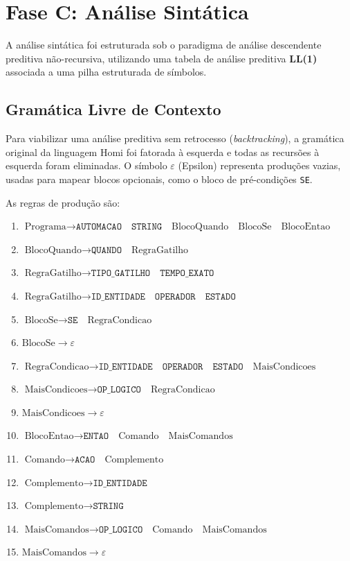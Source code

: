 \documentclass[12pt, a4paper]{article}
\begin{document}
\section{Fase C: Análise Sintática}
A análise sintática foi estruturada sob o paradigma de análise descendente preditiva não-recursiva, utilizando uma tabela de análise preditiva \textbf{LL(1)} associada a uma pilha estruturada de símbolos.

\subsection{Gramática Livre de Contexto}
Para viabilizar uma análise preditiva sem retrocesso (\textit{backtracking}), a gramática original da linguagem Homi foi fatorada à esquerda e todas as recursões à esquerda foram eliminadas. O símbolo $\varepsilon$ (Epsilon) representa produções vazias, usadas para mapear blocos opcionais, como o bloco de pré-condições \texttt{SE}.

As regras de produção são:

\begin{enumerate}
    \item $\text{Programa} \rightarrow \texttt{AUTOMACAO} \quad \texttt{STRING} \quad \text{BlocoQuando} \quad \text{BlocoSe} \quad \text{BlocoEntao}$
    \item $\text{BlocoQuando} \rightarrow \texttt{QUANDO} \quad \text{RegraGatilho}$
    \item $\text{RegraGatilho} \rightarrow \texttt{TIPO\_GATILHO} \quad \texttt{TEMPO\_EXATO}$
    \item $\text{RegraGatilho} \rightarrow \texttt{ID\_ENTIDADE} \quad \texttt{OPERADOR} \quad \texttt{ESTADO}$
    \item $\text{BlocoSe} \rightarrow \texttt{SE} \quad \text{RegraCondicao}$
    \item $\text{BlocoSe} \rightarrow \varepsilon$
    \item $\text{RegraCondicao} \rightarrow \texttt{ID\_ENTIDADE} \quad \texttt{OPERADOR} \quad \texttt{ESTADO} \quad \text{MaisCondicoes}$
    \item $\text{MaisCondicoes} \rightarrow \texttt{OP\_LOGICO} \quad \text{RegraCondicao}$
    \item $\text{MaisCondicoes} \rightarrow \varepsilon$
    \item $\text{BlocoEntao} \rightarrow \texttt{ENTAO} \quad \text{Comando} \quad \text{MaisComandos}$
    \item $\text{Comando} \rightarrow \texttt{ACAO} \quad \text{Complemento}$
    \item $\text{Complemento} \rightarrow \texttt{ID\_ENTIDADE}$
    \item $\text{Complemento} \rightarrow \texttt{STRING}$
    \item $\text{MaisComandos} \rightarrow \texttt{OP\_LOGICO} \quad \text{Comando} \quad \text{MaisComandos}$
    \item $\text{MaisComandos} \rightarrow \varepsilon$
\end{enumerate}
\end{document}
